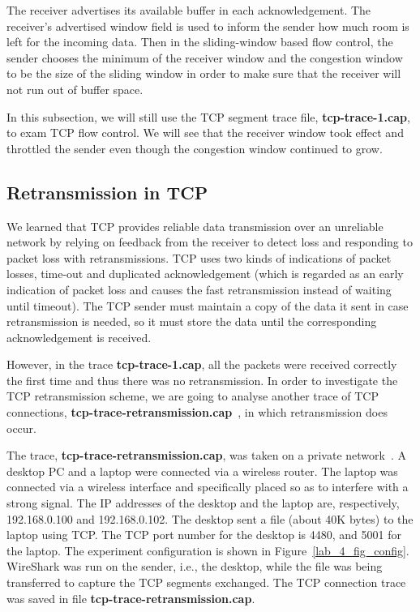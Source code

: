 The receiver advertises its available buffer in each acknowledgement.
The receiver's advertised window field is used to inform the sender
how much room is left for the incoming data. Then in the sliding-window
based flow control, the sender chooses the minimum of the receiver
window and the congestion window to be the size of the sliding window in
order to make sure that the receiver will not run out of buffer
space.

In this subsection, we will still use the TCP segment trace file,
\textbf{tcp-trace-1.cap}, to exam TCP flow control. We will see that
the receiver window took effect and throttled the sender even though
the congestion window continued to grow.

\subsection{Retransmission in TCP}

\hspace*{0.5cm} We learned that TCP provides reliable data
transmission over an unreliable network by relying on feedback from
the receiver to detect loss and responding to packet loss with
retransmissions. TCP uses two kinds of indications of packet losses,
time-out and duplicated acknowledgement (which is regarded as an early
indication of packet loss and causes the fast retransmission instead
of waiting until timeout). The TCP sender must maintain a copy of the
data it sent in case retransmission is needed, so it must store the
data until the corresponding acknowledgement is received.

However, in the trace \textbf{tcp-trace-1.cap}, all the packets were
received correctly the first time and thus there was no
retransmission. In order to investigate the TCP retransmission
scheme, we are going to analyse another trace of TCP connections,
\textbf{tcp-trace-retransmission.cap}~\cite{Matthews04}, in which
retransmission does occur.

The trace, \textbf{tcp-trace-retransmission.cap}, was taken on a
private network~\cite{Matthews04}. A desktop PC and a laptop were
connected via a wireless router. The laptop was connected via a
wireless interface and specifically placed so as to interfere with a
strong signal. The IP addresses of the desktop and the laptop are,
respectively, 192.168.0.100 and 192.168.0.102. The desktop sent a file
(about 40K bytes) to the laptop using TCP. The TCP port number for the
desktop is 4480, and 5001 for the laptop. The experiment configuration
is shown in Figure~\ref{lab_4_fig_config}. WireShark was run on the sender,
i.e., the desktop, while the file was being transferred to capture the
TCP segments exchanged. The TCP connection trace was saved in file
\textbf{tcp-trace-retransmission.cap}.

